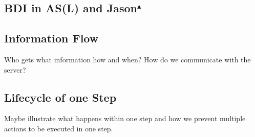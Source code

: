\subsection{BDI in AS(L) and Jason$^{\blacktriangle}$}

\subsection{Information Flow}
Who gets what information how and when? How do we communicate with the server?
\subsection{Lifecycle of one Step}
Maybe illustrate what happens within one step and how we prevent multiple actions to be executed in one step.
